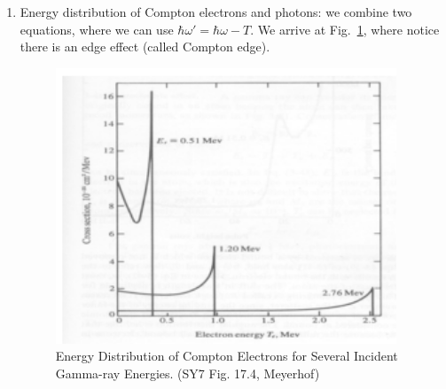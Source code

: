 \documentclass{school-22.101-notes}
\begin{document}
\begin{enumerate}
\item Energy distribution of Compton electrons and photons: we combine two equations,
where we can use $\hbar \omega' = \hbar \omega - T$. We arrive at Fig.~\ref{17.4}, where notice there is an edge effect (called Compton edge). 

\begin{figure}
  \centering
  \includegraphics[width=4in]{images/ni/17.4.png}
  \caption{Energy Distribution of Compton Electrons for Several Incident Gamma-ray Energies. (SY7 Fig. 17.4, Meyerhof)} \label{17.4}
\end{figure}
\end{enumerate}
\end{document}
